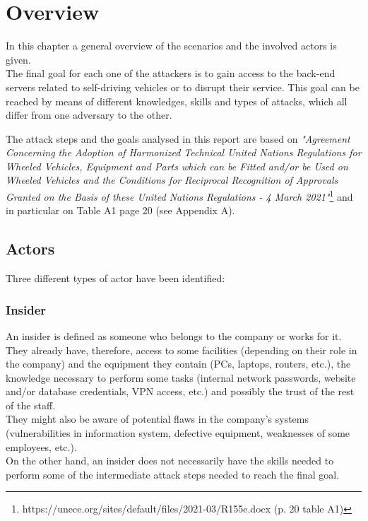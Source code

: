 %
\chapter{Overview}\label{ch:overview}

In this chapter a general overview of the scenarios and the involved actors is given.\\
The final goal for each one of the attackers is to gain access to the back-end servers related to self-driving vehicles or to disrupt their service. This goal can be reached by means of different knowledges, skills and types of attacks, which all differ from one adversary to the other.

\vspace{0.2cm}
\noindent The attack steps and the goals analysed in this report are based on \textit{"Agreement Concerning the Adoption of Harmonized Technical United Nations Regulations for Wheeled Vehicles, Equipment and Parts which can be Fitted and/or be Used on Wheeled Vehicles and the Conditions for Reciprocal Recognition of Approvals Granted on the Basis of these United Nations Regulations - 4 March 2021"}\footnote{https://unece.org/sites/default/files/2021-03/R155e.docx (p. 20 table A1)
} and in particular on Table A1 page 20 (see Appendix A).

\section{Actors}
\noindent Three different types of actor have been identified:

\subsection*{Insider}
An insider is defined as someone who belongs to the company or works for it. They already have, therefore, access to some facilities (depending on their role in the company) and the equipment they contain (PCs, laptops, routers, etc.), the knowledge necessary to perform some tasks (internal network passwords, website and/or database credentials, VPN access, etc.) and possibly the trust of the rest of the staff.\\
They might also be aware of potential flaws in the company's systems (vulnerabilities in information system, defective equipment, weaknesses of some employees, etc.).\\
On the other hand, an insider does not necessarily have the skills needed to perform some of the intermediate attack steps needed to reach the final goal.

